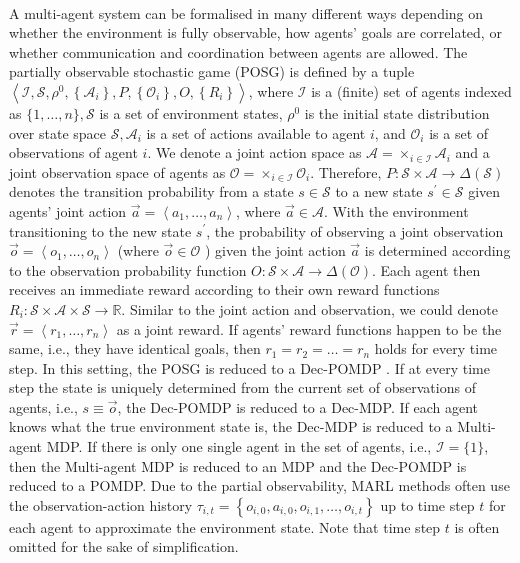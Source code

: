 \documentclass{article}
\begin{document}
\

A multi-agent system can be formalised in many different ways \citep{oliehoek2016concise} depending on whether the environment is fully observable, how agents' goals are correlated, or whether communication and coordination between agents are allowed. The partially observable stochastic game (POSG) \citep{hansen2004dynamic} is defined by a tuple $\left\langle\mathcal{I}, \mathcal{S}, \rho^0,\left\{\mathcal{A}_i\right\}, P,\left\{\mathcal{O}_i\right\}, O,\left\{R_i\right\}\right\rangle$, where $\mathcal{I}$ is a (finite) set of agents indexed as $\{1, \ldots, n\}, \mathcal{S}$ is a set of environment states, $\rho^0$ is the initial state distribution over state space $\mathcal{S}, \mathcal{A}_i$ is a set of actions available to agent $i$, and $\mathcal{O}_i$ is a set of observations of agent $i$. We denote a joint action space as $\mathcal{A}=\times_{i \in \mathcal{I}} \mathcal{A}_i$ and a joint observation space of agents as $\mathcal{O}=\times_{i \in \mathcal{I}} \mathcal{O}_i$. Therefore, $P: \mathcal{S} \times \mathcal{A} \rightarrow \Delta(\mathcal{S})$ denotes the transition probability from a state $s \in \mathcal{S}$ to a new state $s^{\prime} \in \mathcal{S}$ given agents' joint action $\vec{a}=\left\langle a_1, \ldots, a_n\right\rangle$, where $\vec{a} \in \mathcal{A}$. With the environment transitioning to the new state $s^{\prime}$, the probability of observing a joint observation $\vec{o}=\left\langle o_1, \ldots, o_n\right\rangle$ (where $\vec{o} \in \mathcal{O}$ ) given the joint action $\vec{a}$ is determined according to the observation probability function $O: \mathcal{S} \times \mathcal{A} \rightarrow \Delta(\mathcal{O})$. Each agent then receives an immediate reward according to their own reward functions $R_i: \mathcal{S} \times \mathcal{A} \times \mathcal{S} \rightarrow \mathbb{R}$. Similar to the joint action and observation, we could denote $\vec{r}=\left\langle r_1, \ldots, r_n\right\rangle$ as a joint reward. If agents' reward functions happen to be the same, i.e., they have identical goals, then $r_1=r_2=\ldots=r_n$ holds for every time step. In this setting, the POSG is reduced to a Dec-POMDP \citep{oliehoek2016concise}. If at every time step the state is uniquely determined from the current set of observations of agents, i.e., $s \equiv \vec{o}$, the Dec-POMDP is reduced to a Dec-MDP. If each agent knows what the true environment state is, the Dec-MDP is reduced to a Multi-agent MDP. If there is only one single agent in the set of agents, i.e., $\mathcal{I}=\{1\}$, then the Multi-agent MDP is reduced to an MDP and the Dec-POMDP is reduced to a POMDP. Due to the partial observability, MARL methods often use the observation-action history $\tau_{i, t}=\left\{o_{i, 0}, a_{i, 0}, o_{i, 1}, \ldots, o_{i, t}\right\}$ up to time step $t$ for each agent to approximate the environment state. Note that time step $t$ is often omitted for the sake of simplification.
\end{document}
